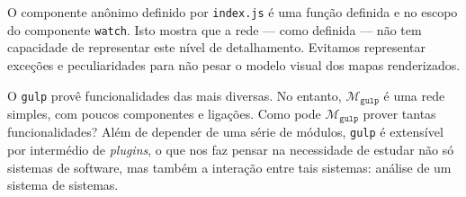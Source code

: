 O componente anônimo definido por \texttt{index.js} é uma função definida e
no escopo do componente \texttt{watch}.
Isto mostra que a rede --- como definida --- não tem capacidade de representar
este nível de detalhamento.
Evitamos representar exceções e peculiaridades para não pesar o modelo visual
dos mapas renderizados.


O \texttt{gulp} provê funcionalidades das mais diversas. No entanto,
$\mathcal{M}_{\texttt{gulp}}$ é uma rede simples, com poucos componentes e 
ligações. Como pode $\mathcal{M}_{\texttt{gulp}}$ prover tantas funcionalidades?
Além de depender de uma série de módulos, \texttt{gulp} é extensível por
intermédio de \textit{plugins}, o que nos faz pensar na necessidade de estudar
não só sistemas de software, mas também a interação entre tais sistemas: análise
de um sistema de sistemas.
